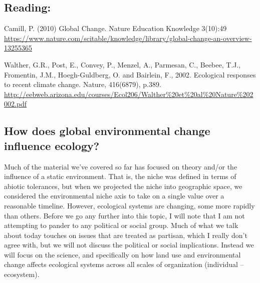 \documentclass[12pt]{article}
\begin{document}
\subsection*{Reading:}

Camill, P. (2010) Global Change. Nature Education Knowledge 3(10):49 \\
\url{https://www.nature.com/scitable/knowledge/library/global-change-an-overview-13255365}

\bigskip

Walther, G.R., Post, E., Convey, P., Menzel, A., Parmesan, C., Beebee, T.J., Fromentin, J.M., Hoegh-Guldberg, O. and Bairlein, F., 2002. Ecological responses to recent climate change. Nature, 416(6879), p.389. \\ \url{http://eebweb.arizona.edu/courses/Ecol206/Walther%20et%20al%20Nature%202002.pdf}
















\begin{center}
\noindent\hrulefill 
\end{center}



\clearpage





\subsection*{How does global environmental change influence ecology?}
Much of the material we've covered so far has focused on theory and/or the influence of a static environment. That is, the niche was defined in terms of abiotic tolerances, but when we projected the niche into geographic space, we considered the environmental niche axis to take on a single value over a reasonable timeline. However, ecological systems are changing, some more rapidly than others. Before we go any further into this topic, I will note that I am not attempting to pander to any political or social group. Much of what we talk about today touches on issues that are treated as partisan, which I really don't agree with, but we will not discuss the political or social implications. Instead we will focus on the science, and specifically on how land use and environmental change affects ecological systems across all scales of organization (individual -- ecosystem). 
\end{document}

